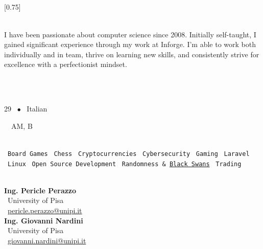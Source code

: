 \subsection*{}
\vspace{2.8em}
\setlength{\columnsep}{1.5cm}
[0.75]
\begin{paracol}{2}

	\paracolbackgroundoptions

	\footnotesize
	{
		\setasidefontcolour
		\flushright
		\begin{center}
		\end{center}

		\\[0.5em]
		{
			\footnotesize
			\RaggedLeft
			I have been passionate about computer science since
			2008. Initially self-taught, I gained significant
			experience  through my work at Inforge. I'm able
			to work both individually and in team, thrive on
			learning new skills, and consistently strive for
			excellence with a perfectionist mindset.
		}
		\bigskip

		\\[0.5em]
		~

		29 ~\(\bullet\)~ Italian

		\faCarSide~~AM, B

		\bigskip

		\\[0.5em]
		~\texttt{Board~Games}
		\quad\faChessPawn~\texttt{Chess}
		\quad\faBitcoin~\texttt{Cryptocurrencies}
		\quad\faLock~\texttt{Cybersecurity}
		\quad\faGamepad~\texttt{Gaming}
		\quad\faLaravel~\texttt{Laravel}
		\quad\faLinux~\texttt{Linux}
		\quad\faCode~\texttt{Open~Source~Development}
		\quad\faDice~\texttt{Randomness~\&~\href{https://en.wikipedia.org/wiki/The_Black_Swan:_The_Impact_of_the_Highly_Improbable}{Black Swans}}
		\quad\faChartLine~\texttt{Trading}

		\bigskip\bigskip

		\\[0.5em]
		\textbf{Ing\@. Pericle Perazzo}\\
		{\color{black!70}\faUniversity~University of Pisa}\\
		{\color{black!70}\faEnvelope[regular]~\href{mailto:pericle.perazzo@unipi.it}{pericle.perazzo@unipi.it}}\\[0.5em]
		\textbf{Ing\@. Giovanni Nardini}\\
		{\color{black!70}\faUniversity~University of Pisa}\\
		{\color{black!70}\faEnvelope[regular]~\href{mailto:giovanni.nardini@unipi.it}{giovanni.nardini@unipi.it}}\\

}
\end{paracol}

